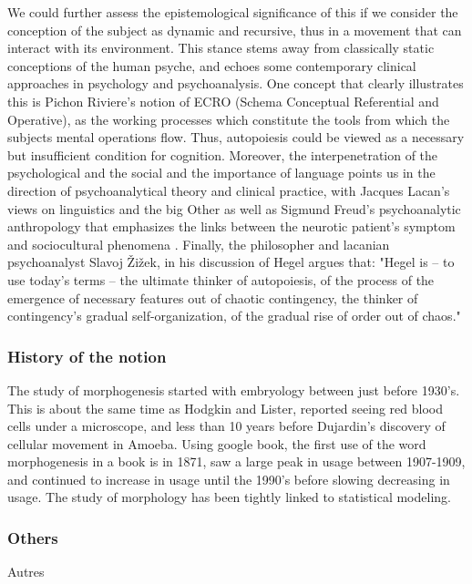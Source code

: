 We could further assess the epistemological significance of this if we consider the conception of the subject as dynamic and recursive, thus in a movement that can interact with its environment. This stance stems away from classically static conceptions of the human psyche, and echoes some contemporary clinical approaches in psychology and psychoanalysis. One concept that clearly illustrates this is Pichon Riviere’s  notion of ECRO (Schema Conceptual Referential and Operative), as the working processes which constitute the tools from which the subjects mental operations flow\cite{pichon_riviere_processus_2004}. Thus, autopoiesis could be viewed as a necessary but insufficient condition for cognition\cite{bitbol_autopoiesis_2004}. Moreover, the interpenetration of the psychological and the social and the importance of language points us in the direction of psychoanalytical theory and clinical practice, with Jacques Lacan’s views on linguistics and the big Other as well as Sigmund Freud’s psychoanalytic anthropology that emphasizes the links between the neurotic patient’s symptom and sociocultural phenomena \cite{freud_totem_1989}. Finally, the philosopher and lacanian psychoanalyst Slavoj Žižek, in his discussion of Hegel argues that: "Hegel is – to use today's terms – the ultimate thinker of autopoiesis, of the process of the emergence of necessary features out of chaotic contingency, the thinker of contingency's gradual self-organization, of the gradual rise of order out of chaos."\cite{zizek_less_2013}


\subsubsection*{History of the notion}
The study of morphogenesis started with embryology between just before 1930's. This is about the same time as Hodgkin and Lister, reported seeing red blood cells under a microscope, and less than 10 years before Dujardin's discovery of cellular movement in Amoeba. \cite{abercrombie1977concepts} Using google book, the first use of the word morphogenesis in a book is in 1871, saw a large peak in usage between 1907-1909, and continued to increase in usage until the 1990's before slowing decreasing in usage. 
The study of morphology has been tightly linked to statistical modeling. 

\subsubsection*{Others}{Autres}



